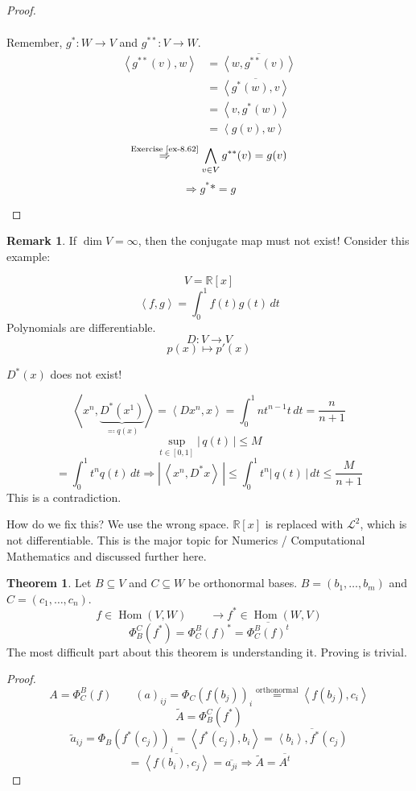 \documentclass[a4paper,landscape,twocolumn]{article}
\newcommand\abs[1]{|\,#1\,|}
\newcommand\functional[1]{\left\langle{#1}\right\rangle}
\theoremstyle{definition}
\newtheorem{theorem}{Theorem}
\newtheorem{rem}{Remark}
\DeclareMathOperator\Hom{Hom} %
\begin{document}
\begin{proof}
\begin{enumerate}
\begin{align*}
      \end{align*}
      Remember, $g^*: W \to V$ and $g^{**}: V \to W$.
      \begin{align*}
        \functional{g^{**}(v), w}
          &= \overline{\functional{w, g^{**}(v)}} \\
          &= \overline{\functional{g^*(w), v}} \\
          &= \functional{v, g^*(w)} \\
          &= \functional{g(v), w}
      \end{align*}
      \[ \overset{\text{Exercise~\ref{ex-8.62}}}{\Rightarrow} \bigwedge_{v \in V} g^{**}(v) = g(v) \]
      \[ \Rightarrow g^** = g \]
  \end{enumerate}
\end{proof}

\begin{rem}
  \label{bem-8.64}
  If $\dim{V} = \infty$, then the conjugate map must not exist!
  Consider this example:

  \[ V = \mathbb R[x] \]
  \[ \functional{f,g} = \int_0^1 f(t) g(t) \, dt \]
  Polynomials are differentiable.
  \[ D: V \to V \]
  \[ p(x) \mapsto p'(x) \]

  $D^*(x)$ does not exist!

  \[ \functional{x^n, \underbrace{D^*(x^1)}_{\eqqcolon q(x)}} = \functional{Dx^n, x} = \int_0^1 n t^{n-1} t \, dt = \frac{n}{n+1} \]
  \[ \sup_{t \in [0,1]} \abs{q(t)} \leq M \]
  \[ = \int_0^1 t^n q(t) \, dt \Rightarrow \abs{\functional{x^n, D^*x}} \leq \int_0^1 t^n \abs{q(t)} \,dt \leq \frac{M}{n+1} \]
  This is a contradiction.

  How do we fix this? We use the wrong space. $\mathbb R[x]$ is replaced with $\mathcal L^2$, which is not differentiable. This is the major topic for Numerics / Computational Mathematics and discussed further here.
\end{rem}

\begin{theorem}
  Let $B \subseteq V$ and $C \subseteq W$ be orthonormal bases.
  $B = (b_1, \ldots, b_m)$ and $C = (c_1, \ldots, c_n)$.
  \[ f \in \Hom(V, W) \qquad \rightarrow f^* \in \Hom(W, V) \]
  \[ \Phi_B^C(f^*) = \Phi_C^B(f)^* = \overline{\Phi_C^B(f)^t} \]
  The most difficult part about this theorem is understanding it.
  Proving is trivial.
\end{theorem}
\begin{proof}
  \[
    A = \Phi_C^B(f) \qquad (a)_{ij} = \Phi_C(f(b_j))_i
    \overset{\text{orthonormal}}{=} \functional{f(b_j), c_i}
  \] \[
    \tilde{A} = \Phi_B^C(f^*)
  \] \[
    \tilde{a}_{ij} = \Phi_B(f^*(c_j))_i = \functional{f^*(c_j), b_i} = \overline{\functional{b_i}, f^*(c_j)}
  \] \[
    = \overline{\functional{f(b_i), c_j}} = \overline{a_{ji}} \Rightarrow \tilde{A} = \overline{A^t}
  \]
\end{proof}
\end{document}
